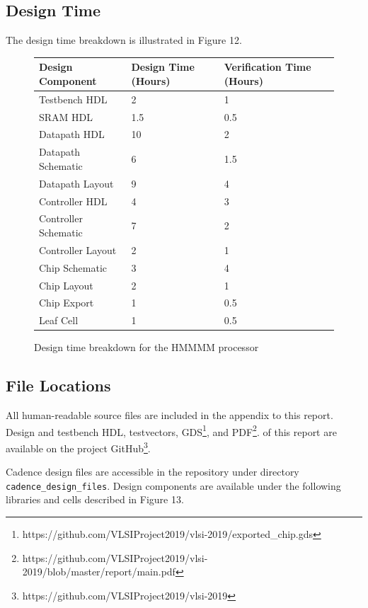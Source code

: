 \documentclass[12pt]{article}
\begin{document}
\subsection{Design Time}

The design time breakdown is illustrated in Figure 12.

\begin{figure}[H]
    \begin{center}
    \begin{tabular}{lll}
        Design Component & Design Time (Hours) & Verification Time (Hours) \\
        \hline
        Testbench HDL & 2 & 1 \\
        SRAM HDL & 1.5 & 0.5 \\
        Datapath HDL & 10 & 2 \\
        Datapath Schematic & 6 & 1.5\\
        Datapath Layout & 9 & 4 \\
        Controller HDL & 4 & 3 \\
        Controller Schematic & 7 & 2 \\
        Controller Layout & 2 & 1 \\
        Chip Schematic & 3 & 4 \\
        Chip Layout & 2 & 1\\
        Chip Export & 1 & 0.5 \\
        Leaf Cell & 1 & 0.5 \\
    \end{tabular}
    \caption{Design time breakdown for the HMMMM processor}
    \end{center}
    \label{fig:designtime}
\end{figure}

\subsection{File Locations}

All human-readable source files are included in the appendix to this report. Design and testbench HDL, testvectors, GDS\footnote{https://github.com/VLSIProject2019/vlsi-2019/exported\_chip.gds}, and PDF\footnote{https://github.com/VLSIProject2019/vlsi-2019/blob/master/report/main.pdf}. of this report are available on the project GitHub\footnote{https://github.com/VLSIProject2019/vlsi-2019}. 

Cadence design files are accessible in the repository under directory \texttt{cadence\_design\_files}. Design components are available under the following libraries and cells described in Figure 13.
\end{document}
